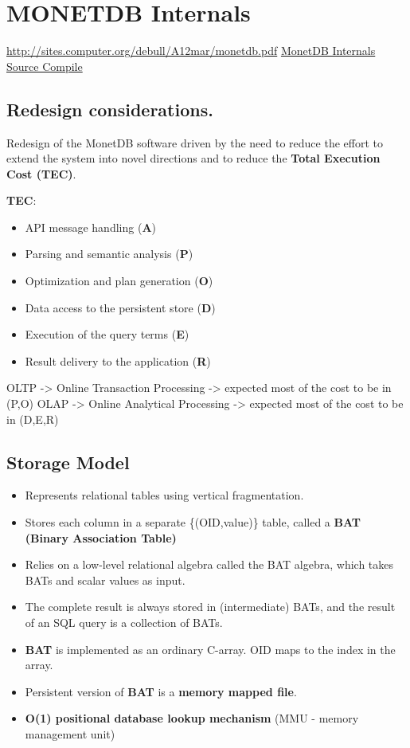 \documentclass[11pt]{article}
\author{Lucas Pereira}
\date{\today}
\title{}
\begin{document}
\tableofcontents


\section{MONETDB Internals}
\label{sec:org2a5861e}

\url{http://sites.computer.org/debull/A12mar/monetdb.pdf}
\href{https://www.monetdb.org/Documentation/MonetDBInternals/Overview}{MonetDB Internals}
\href{https://www.monetdb.org/Developers/SourceCompile}{Source Compile}

\subsection{Redesign considerations.}
\label{sec:org95bd362}
Redesign of the MonetDB software driven by the need to reduce the effort to extend the system into novel directions and to reduce
the \textbf{Total Execution Cost (TEC)}.

\textbf{TEC}:
\begin{itemize}
\item API message handling                (\textbf{A})
\item Parsing and semantic analysis       (\textbf{P})
\item Optimization and plan generation    (\textbf{O})
\item Data access to the persistent store (\textbf{D})
\item Execution of the query terms        (\textbf{E})
\item Result delivery to the application  (\textbf{R})
\end{itemize}

OLTP -> Online Transaction Processing -> expected most of the cost to be in (P,O)
OLAP -> Online Analytical Processing  -> expected most of the cost to be in (D,E,R)

\subsection{Storage Model}
\label{sec:org7899b35}
\begin{itemize}
\item Represents relational tables using vertical fragmentation.
\item Stores each column in a separate \{(OID,value)\} table,  called a \textbf{BAT (Binary Association Table)}
\item Relies on a low-level relational algebra called the BAT algebra, which takes BATs and scalar values as input.
\item The complete result is always stored in (intermediate) BATs, and the result of an SQL query is a collection of BATs.

\item \textbf{BAT} is implemented as an ordinary C-array. OID maps to the index in the array.
\item Persistent version of \textbf{BAT} is a \textbf{memory mapped file}.
\item \textbf{O(1) positional database lookup mechanism} (MMU - memory management unit)
\end{itemize}
\end{document}
